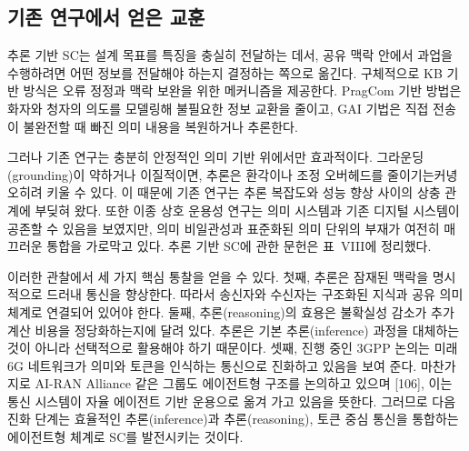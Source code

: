 \subsection{기존 연구에서 얻은 교훈}

추론 기반 SC는 설계 목표를 특징을 충실히 전달하는 데서, 공유 맥락 안에서 과업을 수행하려면 어떤 정보를 전달해야 하는지 결정하는 쪽으로 옮긴다.
구체적으로 KB 기반 방식은 오류 정정과 맥락 보완을 위한 메커니즘을 제공한다.
PragCom 기반 방법은 화자와 청자의 의도를 모델링해 불필요한 정보 교환을 줄이고, GAI 기법은 직접 전송이 불완전할 때 빠진 의미 내용을 복원하거나 추론한다.

그러나 기존 연구는 충분히 안정적인 의미 기반 위에서만 효과적이다.
그라운딩(grounding)이 약하거나 이질적이면, 추론은 환각이나 조정 오버헤드를 줄이기는커녕 오히려 키울 수 있다.
이 때문에 기존 연구는 추론 복잡도와 성능 향상 사이의 상충 관계에 부딪혀 왔다.
또한 이종 상호 운용성 연구는 의미 시스템과 기존 디지털 시스템이 공존할 수 있음을 보였지만, 의미 비일관성과 표준화된 의미 단위의 부재가 여전히 매끄러운 통합을 가로막고 있다.
추론 기반 SC에 관한 문헌은 표~VIII에 정리했다.

이러한 관찰에서 세 가지 핵심 통찰을 얻을 수 있다.
첫째, 추론은 잠재된 맥락을 명시적으로 드러내 통신을 향상한다.
따라서 송신자와 수신자는 구조화된 지식과 공유 의미 체계로 연결되어 있어야 한다.
둘째, 추론(reasoning)의 효용은 불확실성 감소가 추가 계산 비용을 정당화하는지에 달려 있다. 추론은 기본 추론(inference) 과정을 대체하는 것이 아니라 선택적으로 활용해야 하기 때문이다.
셋째, 진행 중인 3GPP 논의는 미래 6G 네트워크가 의미와 토큰을 인식하는 통신으로 진화하고 있음을 보여 준다.
마찬가지로 AI-RAN Alliance 같은 그룹도 에이전트형 구조를 논의하고 있으며 [106], 이는 통신 시스템이 자율 에이전트 기반 운용으로 옮겨 가고 있음을 뜻한다.
그러므로 다음 진화 단계는 효율적인 추론(inference)과 추론(reasoning), 토큰 중심 통신을 통합하는 에이전트형 체계로 SC를 발전시키는 것이다.
